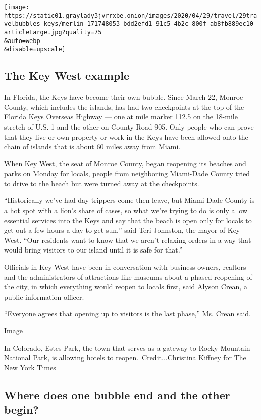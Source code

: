 \texttt{[image: https://static01.graylady3jvrrxbe.onion/images/2020/04/29/travel/29travelbubbles-keys/merlin\_171748053\_bdd2efd1-91c5-4b2c-800f-ab8fb889ec10-articleLarge.jpg?quality=75\\\&auto=webp\\\&disable=upscale]}

\hypertarget{the-key-west-example}{%
\subsection{The Key West example}\label{the-key-west-example}}

In Florida, the Keys have become their own bubble. Since March 22,
Monroe County, which includes the islands, has had two checkpoints at
the top of the Florida Keys Overseas Highway --- one at mile marker
112.5 on the 18-mile stretch of U.S. 1 and the other on County Road 905.
Only people who can prove that they live or own property or work in the
Keys have been allowed onto the chain of islands that is about 60 miles
away from Miami.

When Key West, the seat of Monroe County, began reopening its beaches
and parks on Monday for locals, people from neighboring Miami-Dade
County tried to drive to the beach but were turned away at the
checkpoints.

``Historically we've had day trippers come then leave, but Miami-Dade
County is a hot spot with a lion's share of cases, so what we're trying
to do is only allow essential services into the Keys and say that the
beach is open only for locals to get out a few hours a day to get sun,''
said Teri Johnston, the mayor of Key West. ``Our residents want to know
that we aren't relaxing orders in a way that would bring visitors to our
island until it is safe for that.''

Officials in Key West have been in conversation with business owners,
realtors and the administrators of attractions like museums about a
phased reopening of the city, in which everything would reopen to locals
first, said Alyson Crean, a public information officer.

``Everyone agrees that opening up to visitors is the last phase,'' Ms.
Crean said.

Image

In Colorado, Estes Park, the town that serves as a gateway to Rocky
Mountain National Park, is allowing hotels to reopen.~Credit...Christina
Kiffney for The New York Times

\hypertarget{where-does-one-bubble-end-and-the-other-begin}{%
\subsection{Where does one bubble end and the other
begin?}\label{where-does-one-bubble-end-and-the-other-begin}}

